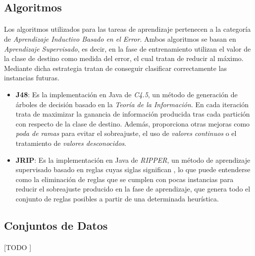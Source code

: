 \documentclass{article}
\begin{document}
		\subsection{Algoritmos}

			\paragraph{}
			Los algoritmos utilizados para las tareas de aprendizaje pertenecen a la categoría de \emph{Aprendizaje Inductivo Basado en el Error}. Ambos algoritmos se basan en \emph{Aprendizaje Supervisado}, es decir, en la fase de entrenamiento utilizan el valor de la clase de destino como medida del error, el cual tratan de reducir al máximo. Mediante dicha estrategia tratan de conseguir clasificar correctamente las instancias futuras.

			\begin{itemize}
				
				\item \textbf{J48}: Es la implementación en Java de \emph{C4.5}, un método de generación de árboles de decisión basado en la \emph{Teoría de la Información}. En cada iteración trata de maximizar la ganancia de información producida tras cada partición con respecto de la clase de destino. Además, proporciona otras mejoras como \emph{poda de ramas} para evitar el sobreajuste, el uso de \emph{valores continuos} o el tratamiento de \emph{valores desconocidos}.


				\item \textbf{JRIP}: Es la implementación en Java de \emph{RIPPER}, un método de aprendizaje supervisado basado en reglas cuyas siglas significan , lo que puede entenderse como la eliminación de reglas que se cumplen con pocas instancias para reducir el sobreajuste producido en la fase de aprendizaje, que genera todo el conjunto de reglas posibles a partir de una determinada heurística.

			\end{itemize}

		\subsection{Conjuntos de Datos}

			\paragraph{}
			[TODO ]
\end{document}

